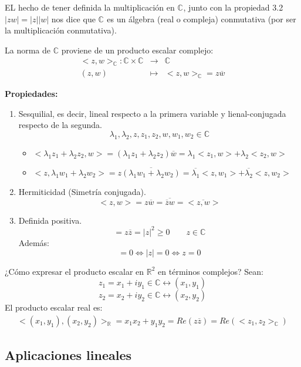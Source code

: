 EL hecho de tener definida la multiplicación en \(\mathbb{C}^{}\), junto con la propiedad 3.2 \(|zw| = |z||w|\) nos dice que \(\mathbb{C}^{}\) es un álgebra (real o compleja) conmutativa (por ser la multiplicación conmutativa).

La norma de \(\mathbb{C}\) proviene de un producto escalar complejo:
\begin{eqnarray*}
  <z,w>_{\mathbb{C}} : \mathbb{C} \times \mathbb{C} & \rightarrow & \mathbb{C} \\
  (z,w) & \mapsto & <z,w>_{\mathbb{C}} = z \overline{w}
\end{eqnarray*}

\textbf{Propiedades:}
\begin{enumerate}
  \item Sesquilial, es decir, lineal respecto a la primera variable y lienal-conjugada respecto de la segunda. 
    \[\lambda_1,\lambda_2,z,z_1,z_2,w,w_1,w_2\in \mathbb{C}\]
    \begin{itemize}
      \item \(<\lambda_1z_1+\lambda_2z_2,w> = (\lambda_1z_1+\lambda_2z_2)\overline{w} = \lambda_1 <z_1,w> + \lambda_2<z_2,w>\)
      \item \(<z,\lambda_1w_1+\lambda_2w_2> = z\overline{(\lambda_1w_1+\lambda_2w_2)} = \overline{\lambda_1} <z,w_1> + \overline{\lambda_2}<z,w_2>\)
    \end{itemize}
  \item Hermiticidad (Simetría conjugada).
    \[ <z,w> = z\overline{w}= \overline{\overline{z}w}= <\overline{z,w}> \] %
  \item Definida positiva.
    \[<z,z> = z \overline{z} = |z|^2 \geq 0 \qquad z \in \mathbb{C}\]
    Además:
    \[<z,z>=0 \Leftrightarrow |z| = 0 \Leftrightarrow z = 0\]
\end{enumerate}

¿Cómo expresar el producto escalar en \(\mathbb{R}^{2}\) en términos complejos?
Sean:
\[z_1 = x_1+iy_1 \in \mathbb{C} \leftrightarrow (x_1,y_1)\]
\[z_2 = x_2+iy_2 \in \mathbb{C} \leftrightarrow (x_2,y_2)\]
El producto escalar real es:
\begin{eqnarray*}
  <(x_1,y_1),(x_2,y_2)>_{\mathbb{R}} = x_1x_2+y_1y_2 = Re(z\overline{z}) = Re(<z_1,z_2>_{\mathbb{C}})
\end{eqnarray*}
\subsection{Aplicaciones lineales}

